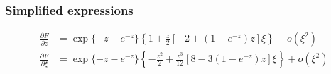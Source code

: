 \subsubsection*{Simplified expressions}

{\color{red}
\begin{align*}
  \frac{\partial F}{\partial z}
  &= \exp\{ -z - e^{-z} \} \left\{ 1 + \frac{z}{2} \left[ -2 + (1 -e^{-z}) z \right] \xi \right\} + o(\xi^2) \\
  \frac{\partial F}{\partial \xi}
  &= \exp\{ -z - e^{-z} \}
    \left\{-\frac{z^2}{2}
    + \frac{z^3}{12} \left[8 - 3 (1 -e^{-z}) z \right] \xi \right\}
    + o(\xi^2)
\end{align*}
}




